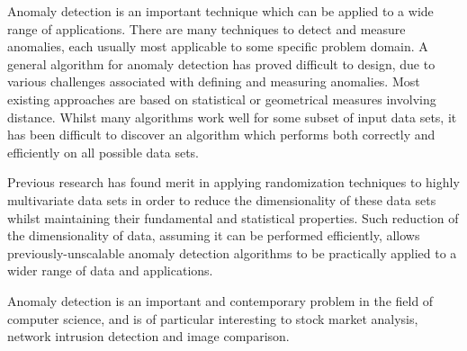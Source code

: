 Anomaly detection is an important technique which can be applied to a wide range
of applications. There are many techniques to detect and measure anomalies, each
usually most applicable to some specific problem domain. A general algorithm for
anomaly detection has proved difficult to design, due to various challenges 
associated with defining and measuring anomalies. Most existing approaches are 
based on statistical or geometrical measures involving distance. Whilst many 
algorithms work well for some subset of input data sets, it has been difficult 
to discover an algorithm which performs both correctly and efficiently on all 
possible data sets.

Previous research has found merit in applying randomization techniques to highly
multivariate data sets in order to reduce the dimensionality of these data sets 
whilst maintaining their fundamental and statistical properties. Such reduction 
of the dimensionality of data, assuming it can be performed efficiently, allows 
previously-unscalable anomaly detection algorithms to be practically applied to 
a wider range of data and applications.

Anomaly detection is an important and contemporary problem in the field of 
computer science, and is of particular interesting to stock market analysis, 
network intrusion detection and image comparison.
